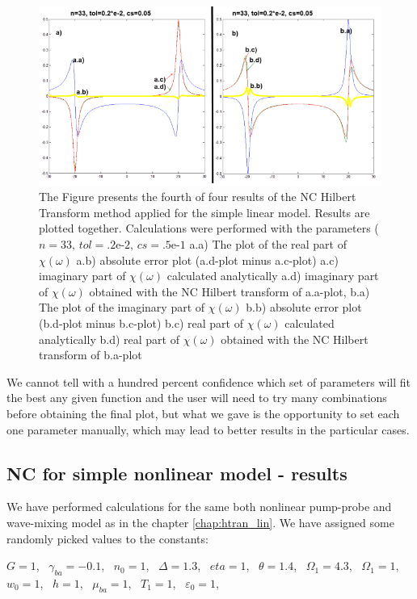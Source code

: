 \documentclass[12pt,twoside,a4paper]{article}
\numberwithin{equation}{subsection}
\numberwithin{figure}{subsection}
\begin{document}
\begin{figure}
  \includegraphics[width=150mm]{img/nc_lin4.png}
  \caption{The Figure presents the fourth of four results of the NC Hilbert Transform method applied for the simple linear model. Results
   are plotted together. Calculations were performed with the parameters ($n=33, \,tol=\mbox{.2e-2}, \,cs=\mbox{.5e-1}$
    a.a) The plot of the real part of $\chi (\omega )$
    a.b) absolute error plot (a.d-plot minus a.c-plot) 
    a.c) imaginary part of $\chi (\omega )$ calculated analytically 
    a.d) imaginary part of $\chi (\omega )$ obtained with the NC Hilbert transform of a.a-plot,
    b.a) The plot of the imaginary part of $\chi (\omega )$
    b.b) absolute error plot (b.d-plot minus b.c-plot) 
    b.c) real part of $\chi (\omega )$ calculated analytically 
    b.d) real part of $\chi (\omega )$ obtained with the NC Hilbert transform of b.a-plot
    \label{fig:nc_lin4} 
    }
\end{figure}

We cannot tell with a hundred percent confidence which set of parameters will fit the best any given function and the user will
need to try many combinations before obtaining the final plot, but what we gave is the opportunity to set each one parameter manually,
which may lead to better results in the particular cases.

\subsection{NC for simple nonlinear model - results} \label{chap:nc_nlo}

We have performed calculations for the same both nonlinear pump-probe and wave-mixing model as in the chapter \ref{chap:htran_lin}.
We have assigned some randomly picked values to the constants: 
 
  $G             = 1$, \,
  $\gamma_{ba}   = -0.1$, \, 
  $n_0           = 1$, \,
  $\Delta        = 1.3$, \,
  $eta           = 1$, \,
  $\theta        = 1.4$, \,
  $\Omega_1      = 4.3$, \,
  $\Omega_1      = 1$, \,
  $w_0           = 1$, \,
  $h             = 1$, \,
  $\mu_{ba}      = 1$, \,
  $T_1           = 1$, \,
  $\varepsilon_0 = 1$,
\end{document}
